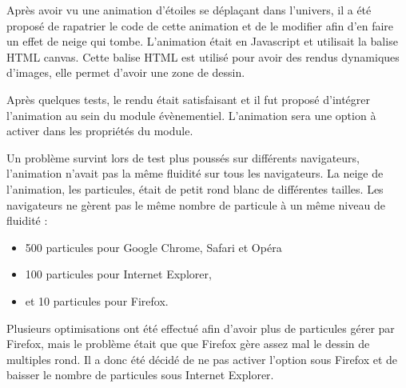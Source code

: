 \documentclass[12pt,a4paper]{article}
\begin{document}
\bigskip
Après avoir vu une animation d'étoiles se déplaçant dans l'univers, il a été proposé de rapatrier le code de cette animation et de le modifier afin d'en faire un effet de neige qui tombe. L'animation était en Javascript et utilisait la balise HTML canvas. Cette balise HTML est utilisé pour avoir des rendus dynamiques d'images, elle permet d'avoir une zone de dessin.\par 
Après quelques tests, le rendu était satisfaisant et il fut proposé d'intégrer l'animation au sein du module évènementiel. L'animation sera une option à activer dans les propriétés du module.\par 
Un problème survint lors de test plus poussés sur différents navigateurs, l'animation n'avait pas la même fluidité sur tous les navigateurs. La neige de l'animation, les particules, était de petit rond blanc de différentes tailles. Les navigateurs ne gèrent pas le même nombre de particule à un même niveau de fluidité :
\begin{itemize}
\item 500 particules pour Google Chrome, Safari et Opéra
\item 100 particules pour Internet Explorer,
\item et 10 particules pour Firefox.
\end{itemize}\par 
Plusieurs optimisations ont été effectué afin d'avoir plus de particules gérer par Firefox, mais le problème était que que Firefox gère assez mal le dessin de multiples rond. Il a donc été décidé de ne pas activer l'option sous Firefox et de baisser le nombre de particules sous Internet Explorer.\par 
\end{document}
